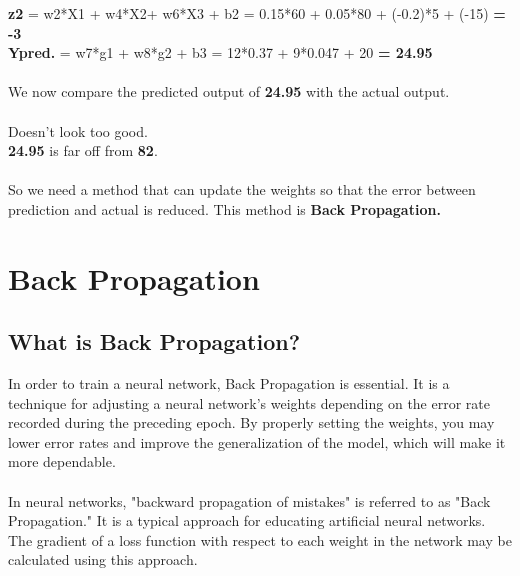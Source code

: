 \documentclass{article}
\begin{document}
\textbf{z2} = w2*X1 + w4*X2+ w6*X3 + b2 = 0.15*60 + 0.05*80 + (-0.2)*5 + (-15) \textbf{= -3}
\\\textbf{Ypred.} = w7*g1 + w8*g2 + b3 = 12*0.37 + 9*0.047 + 20 \textbf{= 24.95}\\
\\ We now compare the predicted output of \textbf{24.95} with the actual output.\\
\\Doesn't look too good.
\\\textbf{24.95} is far off from \textbf{82}.\\
\\So we need a method that can update the weights so that the error between prediction and actual is reduced. This method is \textbf{Back Propagation.}\\
\pagebreak
\section{Back Propagation}
\subsection{What is Back Propagation?}
In order to train a neural network, Back Propagation is essential. It is a technique for adjusting a neural network's weights depending on the error rate recorded during the preceding epoch. By properly setting the weights, you may lower error rates and improve the generalization of the model, which will make it more dependable.\\\\
In neural networks, "backward propagation of mistakes" is referred to as "Back Propagation." It is a typical approach for educating artificial neural networks. The gradient of a loss function with respect to each weight in the network may be calculated using this approach.
\end{document}
